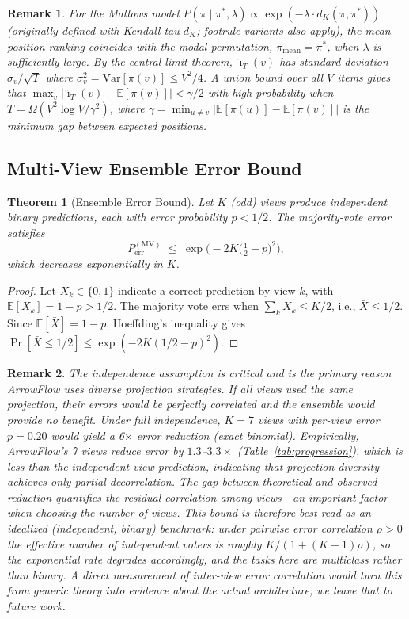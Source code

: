 \documentclass[12pt]{article}
\newcommand{\E}{\mathbb{E}}
\newtheorem{theorem}{Theorem}
\newtheorem{remark}{Remark}
\begin{document}
\begin{remark}
For the Mallows model $P(\pi \mid \pi^*, \lambda) \propto \exp(-\lambda \cdot d_K(\pi, \pi^*))$ \citep{mallows1957nonnull} (originally defined with Kendall tau $d_K$; footrule variants also apply), the mean-position ranking coincides with the modal permutation, $\pi_{\mathrm{mean}} = \pi^*$, when $\lambda$ is sufficiently large. By the central limit theorem, $\hat{\imath}_T(v)$ has standard deviation $\sigma_v / \sqrt{T}$ where $\sigma_v^2 = \mathrm{Var}[\pi(v)] \leq V^2/4$. A union bound over all $V$ items gives that $\max_v |\hat{\imath}_T(v) - \E[\pi(v)]| < \gamma/2$ with high probability when $T = \Omega(V^2 \log V / \gamma^2)$, where $\gamma = \min_{u \neq v}|\E[\pi(u)] - \E[\pi(v)]|$ is the minimum gap between expected positions.
\end{remark}

\subsection{Multi-View Ensemble Error Bound}

\begin{theorem}[Ensemble Error Bound]
\label{thm:ensemble}
Let $K$ (odd) views produce independent binary predictions, each with error probability $p < 1/2$. The majority-vote error satisfies
\[
P_{\mathrm{err}}^{(\mathrm{MV})} \;\leq\; \exp\!\Big(-2K\big(\tfrac{1}{2} - p\big)^2\Big),
\]
which decreases exponentially in $K$.
\end{theorem}

\begin{proof}
Let $X_k \in \{0,1\}$ indicate a correct prediction by view $k$, with $\E[X_k] = 1-p > 1/2$. The majority vote errs when $\sum_k X_k \leq K/2$, i.e., $\bar{X} \leq 1/2$. Since $\E[\bar{X}] = 1-p$, Hoeffding's inequality gives $\Pr[\bar{X} \leq 1/2] \leq \exp(-2K(1/2 - p)^2)$.
\end{proof}

\begin{remark}
The independence assumption is critical and is the primary reason ArrowFlow uses diverse projection strategies. If all views used the same projection, their errors would be perfectly correlated and the ensemble would provide no benefit. Under full independence, $K = 7$ views with per-view error $p = 0.20$ would yield a 6$\times$ error reduction (exact binomial). Empirically, ArrowFlow's 7 views reduce error by $1.3$--$3.3\times$ (Table~\ref{tab:progression}), which is less than the independent-view prediction, indicating that projection diversity achieves only partial decorrelation. The gap between theoretical and observed reduction quantifies the residual correlation among views---an important factor when choosing the number of views. This bound is therefore best read as an \emph{idealized} (independent, binary) benchmark: under pairwise error correlation $\rho > 0$ the effective number of independent voters is roughly $K/(1 + (K-1)\rho)$, so the exponential rate degrades accordingly, and the tasks here are multiclass rather than binary. A direct measurement of inter-view error correlation would turn this from generic theory into evidence about the actual architecture; we leave that to future work.
\end{remark}
\end{document}
